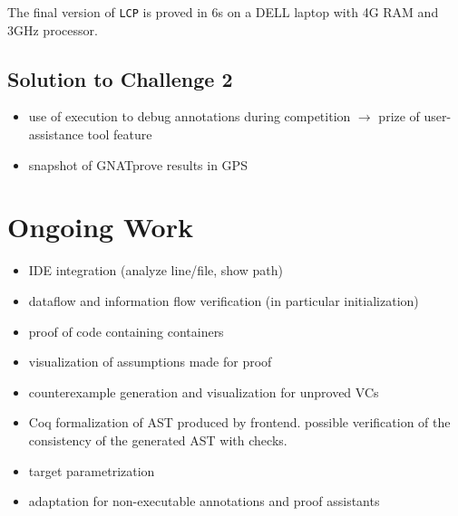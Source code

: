\documentclass[sttt,draft]{svjour}
\begin{document}
The final version of \verb|LCP| is proved in 6s on a DELL laptop with 4G RAM
and 3GHz processor.

\subsection{Solution to Challenge 2}

\begin{itemize}
\item use of execution to debug annotations during competition $\rightarrow$
  prize of user-assistance tool feature
\item snapshot of GNATprove results in GPS
\end{itemize}

\section{Ongoing Work}
\label{ongoing}

\begin{itemize}
\item IDE integration (analyze line/file, show path)
\item dataflow and information flow verification (in particular initialization)
\item proof of code containing containers
\item visualization of assumptions made for proof
\item counterexample generation and visualization for unproved VCs
\item Coq formalization of AST produced by frontend. possible verification of
  the consistency of the generated AST with checks.
\item target parametrization
\item adaptation for non-executable annotations and proof assistants
\end{itemize}

%


\end{document}
